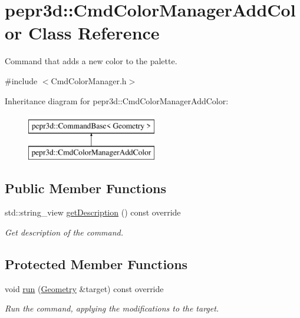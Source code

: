 \hypertarget{classpepr3d_1_1_cmd_color_manager_add_color}{}\section{pepr3d\+::Cmd\+Color\+Manager\+Add\+Color Class Reference}
\label{classpepr3d_1_1_cmd_color_manager_add_color}


Command that adds a new color to the palette.  




{\ttfamily \#include $<$Cmd\+Color\+Manager.\+h$>$}

Inheritance diagram for pepr3d\+::Cmd\+Color\+Manager\+Add\+Color\+:\begin{figure}[H]
\begin{center}
\leavevmode
\includegraphics[height=2.000000cm]{classpepr3d_1_1_cmd_color_manager_add_color}
\end{center}
\end{figure}
\subsection*{Public Member Functions}
\begin{DoxyCompactItemize}
\item 
\mbox{\label{classpepr3d_1_1_cmd_color_manager_add_color_adbabbf01c7650eb626675f0611806089}} 
std\+::string\+\_\+view \mbox{\hyperlink{classpepr3d_1_1_cmd_color_manager_add_color_adbabbf01c7650eb626675f0611806089}{get\+Description}} () const override
\begin{DoxyCompactList}\small\item\em Get description of the command. \end{DoxyCompactList}\end{DoxyCompactItemize}
\subsection*{Protected Member Functions}
\begin{DoxyCompactItemize}
\item 
\mbox{\label{classpepr3d_1_1_cmd_color_manager_add_color_a900866856f9b243902938f0b6534e713}} 
void \mbox{\hyperlink{classpepr3d_1_1_cmd_color_manager_add_color_a900866856f9b243902938f0b6534e713}{run}} (\mbox{\hyperlink{classpepr3d_1_1_geometry}{Geometry}} \&target) const override
\begin{DoxyCompactList}\small\item\em Run the command, applying the modifications to the target. \end{DoxyCompactList}\end{DoxyCompactItemize}


